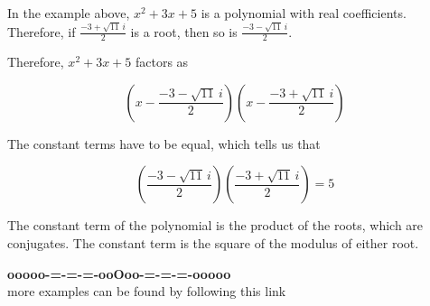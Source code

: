 \documentclass{ximera}
\begin{document}
\begin{observation}

In the example above, $x^2 + 3x + 5$ is a polynomial with real coefficients.  Therefore, if $\frac{-3 + \sqrt{11} \, i}{2}$ is a root, then so is $\frac{-3 - \sqrt{11} \, i}{2}$.



Therefore, $x^2 + 3x + 5$ factors as



\[ \left( x - \frac{-3 - \sqrt{11} \, i}{2} \right)  \left( x - \frac{-3 + \sqrt{11} \, i}{2} \right)    \]


The constant terms have to be equal, which tells us that 


\[    \left( \frac{-3 - \sqrt{11} \, i}{2} \right)  \left( \frac{-3 + \sqrt{11} \, i}{2} \right)  = 5    \]




The constant term of the polynomial is the product of the roots, which are conjugates.  The constant term is the square of the modulus of either root.





\end{observation}













\begin{center}
\textbf{\textcolor{green!50!black}{ooooo-=-=-=-ooOoo-=-=-=-ooooo}} \\

more examples can be found by following this link\\ 

\end{center}
\end{document}
